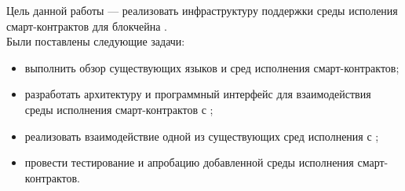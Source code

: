 Цель данной работы --- реализовать инфраструктуру поддержки среды исполения смарт-контрактов для блокчейна .
\\

Были поставлены следующие задачи:
\begin{itemize}
    \item выполнить обзор существующих языков и сред исполнения смарт-кон\-трак\-тов;
    \item разработать архитектуру и программный интерфейс для взаимодействия среды исполнения смарт-контрактов с ;
    \item реализовать взаимодействие одной из существующих сред исполнения с ;
    \item провести тестирование и апробацию добавленной среды исполнения смарт-контрактов.
\end{itemize}